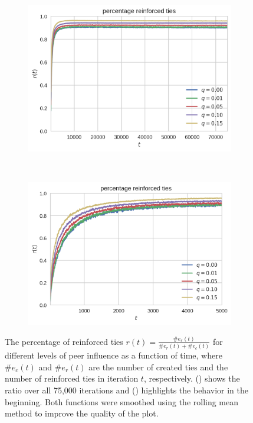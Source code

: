 \begin{figure}[htbp]
\centering
\begin{subfigure}[b]{0.485\textwidth}
  \includegraphics[width=\textwidth]{figures/percentage-reinforced-ties-full}
  \caption{}
  \label{fig:percentage-reinforced-ties-full}
\end{subfigure}
~
\begin{subfigure}[b]{0.485\textwidth}
  \includegraphics[width=\textwidth]{figures/percentage-reinforced-ties-beginning}
  \caption{}
  \label{fig:percentage-reinforced-ties-beginning}
\end{subfigure}

\caption[Percentage of reinforced ties as function of time]{The percentage of reinforced ties \( r(t) = \frac{\#e_{r}(t)}{\#e_{r}(t) + \#e_{c}(t)} \) for different levels of peer influence as a function of time, where \( \#e_{c}(t) \) and \( \#e_{r}(t) \) are the number of created ties and  the number of reinforced ties in iteration \( t \), respectively. () shows the ratio over all 75,000 iterations and () highlights the behavior in the beginning. Both functions were smoothed using the rolling mean method to improve the quality of the plot.}
\label{fig:percentage-reinforced-ties}
\end{figure}


